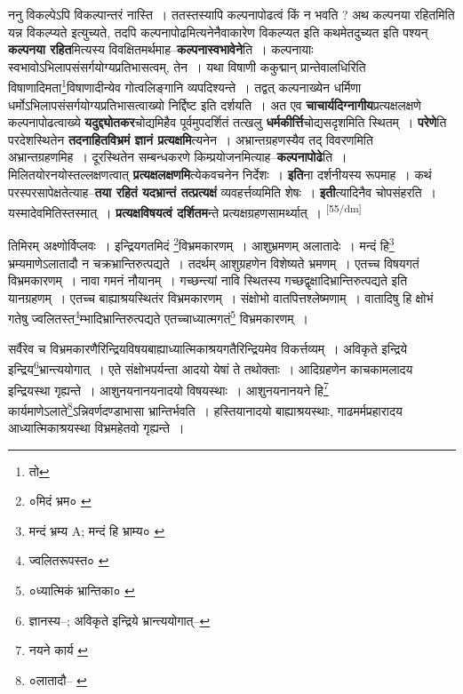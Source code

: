 \documentclass[article,12pt,a4paper]{memoir}
\begin{document}
	  \pstart ननु विकल्पेऽपि विकल्पान्तरं नास्ति । ततस्तस्यापि कल्पनापोढत्वं किं न भवति ? अथ कल्पनया रहितमिति यन्न विकल्प्यते इत्युच्यते, तदपि कल्पनापोढमित्यनेनैवाकारेण विकल्प्यत इति कथमेतदुच्यत इति पश्यन् \textbf{कल्पनया रहित}मित्यस्य विवक्षितमर्थमाह--\textbf{कल्पनास्वभावेने}ति । कल्पनायाः स्वभावोऽभिलापसंसर्गयोग्यप्रतिभासत्वम्, तेन । यथा विषाणी ककुद्मान् प्रान्तेवालधिरिति विषाणादिमता\footnote{तो}विषाणादीन्येव गोत्वलिङ्गानि व्यपदिश्यन्ते । तद्वत् कल्पनाख्येन धर्मिणा धर्मोऽभिलापसंसर्गयोग्यप्रतिभासत्वाख्यो निर्द्दिष्ट इति दर्शयति । अत एव \textbf{चाचार्यदिग्नागीय}प्रत्यक्षलक्षणे कल्पनापोढत्वाख्ये \textbf{यदुद्द्योतकर}चोद्यमिहैव पूर्वमुपदर्शितं तत्खलु \textbf{धर्मकीर्त्ति}चोद्यसदृशमिति स्थितम् । \textbf{परेणे}ति परदेशस्थितेन \textbf{तदनाहितविभ्रमं ज्ञानं प्रत्यक्षमि}त्यनेन । अभ्रान्तग्रहणस्यैव तद् विवरणमिति अभ्रान्तग्रहणमिह । दूरस्थितेन सम्बन्धकरणे किम्प्रयोजनमित्याह--\textbf{कल्पनापोढे}ति । मिलितयोरनयोस्तल्लक्षणत्वात् \textbf{प्रत्यक्षलक्षणमि}त्येकवचनेन निर्देशः । \textbf{इति}ना दर्शनीयस्य रूपमाह । कथं परस्परसापेक्षतेत्याह--\textbf{तया रहितं यदभ्रान्तं तत्प्रत्यक्षं} व्यवहर्त्तव्यमिति शेषः । \textbf{इती}त्यादिनैव चोपसंहरति । यस्मादेवमितिस्तस्मात् । \textbf{प्रत्यक्षविषयत्वं दर्शितम}न्ते प्रत्यक्षग्रहणसामर्थ्यात् ।
	\pend
      \leavevmode\textsuperscript{\rmlatinfont\tiny [55/dm]}

	  \pstart तिमिरम् अक्ष्णोर्विप्लवः । इन्द्रियगतमिदं \footnote{०मिदं भ्रम० \cite{dp-msB}}विभ्रमकारणम् । आशुभ्रमणम् अलातादेः । मन्दं हि\footnote{मन्दं भ्रम्य A; मन्दं हि भ्राम्य० \cite{dp-msC} \cite{dp-msD} \cite{dp-msB} \cite{dp-edN}} भ्रम्यमाणेऽलातादौ न चक्रभ्रान्तिरुत्पद्यते । तदर्थम् आशुग्रहणेन विशेष्यते भ्रमणम् । एतच्च विषयगतं विभ्रमकारणम् । नावा गमनं नौयानम् । गच्छन्त्यां नावि स्थितस्य गच्छद्वृक्षादिभ्रान्तिरुत्पद्यते इति यानग्रहणम् । एतच्च बाह्याश्रयस्थितंर विभ्रमकारणम् । संक्षोभो वातपित्तश्लेष्मणाम् । वातादिषु हि क्षोभं गतेषु ज्वलितस्त\footnote{ज्वलितरूपस्त० \cite{dp-msB} \cite{dp-msD}}म्भादिभ्रान्तिरुत्पद्यते एतच्चाध्यात्मगतं\footnote{०ध्यात्मिकं भ्रान्तिका० \cite{dp-msB} \cite{dp-msD}} विभ्रमकारणम् ।
	\pend
       

	  \pstart सर्वैरेव च विभ्रमकारणैरिन्द्रियविषयबाह्याध्यात्मिकाश्रयगतैरिन्द्रियमेव विकर्त्तव्यम् । अविकृते इन्द्रिये इन्द्रिय\footnote{ज्ञानस्य--\cite{dp-msD-n}; अविकृते इन्द्रिये भ्रान्त्ययोगात्--\cite{dp-msB}}भ्रान्त्ययोगात् । एते संक्षोभपर्यन्ता आदयो येषां ते तथोक्ताः । आदिग्रहणेन काचकामलादय इन्द्रियस्था गृह्यन्ते । आशुनयनानयनादयो विषयस्थाः । आशुनयनानयने हि\footnote{नयने कार्य \cite{dp-msB} \cite{dp-msD} \cite{dp-edN}} कार्यमाणेऽलाते\footnote{०लातादौ--\cite{dp-msA} \cite{dp-edP} \cite{dp-edH} \cite{dp-edN}}ऽन्निवर्णदण्डाभासा भ्रान्तिर्भवति । हस्तियानादयो बाह्याश्रयस्थाः, गाढमर्मप्रहारादय आध्यात्मिकाश्रयस्था विभ्रमहेतवो गृह्यन्ते ।
	\pend
       
\end{document}

